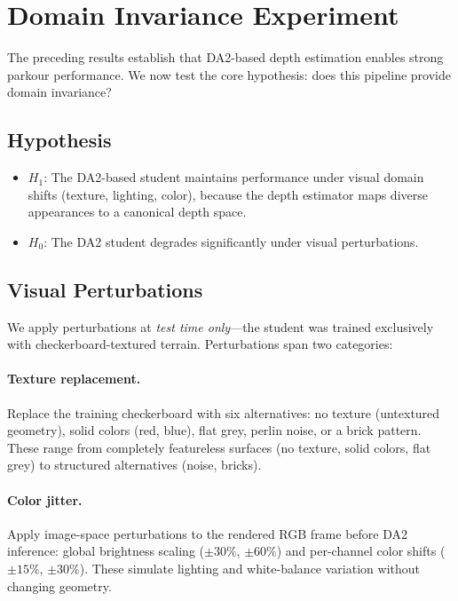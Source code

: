 \section{Domain Invariance Experiment}
\label{sec:domain}

The preceding results establish that DA2-based depth estimation
enables strong parkour performance.  We now test the core hypothesis:
does this pipeline provide domain invariance?

\subsection{Hypothesis}

\begin{itemize}
  \item $H_1$: The DA2-based student maintains performance under
    visual domain shifts (texture, lighting, color), because the depth
    estimator maps diverse appearances to a canonical depth space.
  \item $H_0$: The DA2 student degrades significantly under
    visual perturbations.
\end{itemize}

\subsection{Visual Perturbations}

We apply perturbations at \emph{test time only}---the student was
trained exclusively with checkerboard-textured terrain.  Perturbations
span two categories:

\paragraph{Texture replacement.}
Replace the training checkerboard with six alternatives: no texture
(untextured geometry), solid colors (red, blue), flat grey, perlin
noise, or a brick pattern.  These range from completely featureless
surfaces (no texture, solid colors, flat grey) to structured
alternatives (noise, bricks).

\paragraph{Color jitter.}
Apply image-space perturbations to the rendered RGB frame before DA2
inference: global brightness scaling ($\pm30\%$, $\pm60\%$) and
per-channel color shifts ($\pm15\%$, $\pm30\%$).  These simulate
lighting and white-balance variation without changing geometry.

